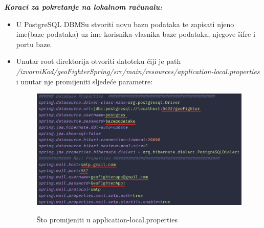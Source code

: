 			\textbf{\textit{Koraci za pokretanje na lokalnom računalu:}}
			
			\begin{itemize}
				
				\item U PostgreSQL DBMSu stvoriti novu bazu podataka te zapisati njeno ime(baze podataka) uz ime korisnika-vlasnika baze podataka, njegove šifre i portu baze.
				
				\item Unutar root direktorija otvoriti datoteku čiji je path\\ \textit{/izvorniKod/geoFighterSpring/src/main/resources/application-local.properties}\\ i unutar nje promijeniti sljedeće parametre: 
			
				\begin{figure}[H]
					\centering
					\includegraphics[scale=0.4]{slike/Properties} \\%
					\caption{Što promijeniti u application-local.properties}
					\label{fig:properties} %
				\end{figure}
			

\end{itemize}
